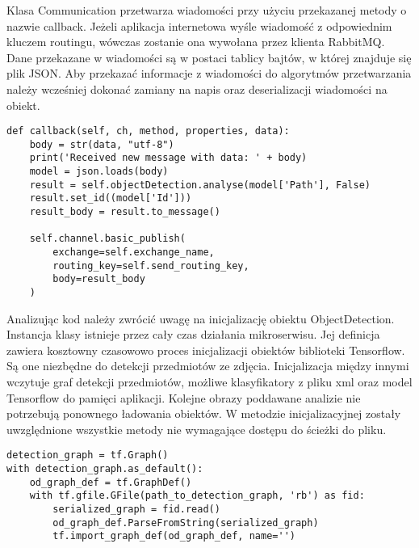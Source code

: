 \begin{itemize}
Klasa Communication przetwarza wiadomości przy użyciu przekazanej metody o nazwie callback. Jeżeli aplikacja internetowa wyśle wiadomość z odpowiednim kluczem routingu, wówczas zostanie ona wywołana przez klienta RabbitMQ. Dane przekazane w wiadomości są w postaci tablicy bajtów, w której znajduje się plik JSON. Aby przekazać informacje z wiadomości do algorytmów przetwarzania należy wcześniej dokonać zamiany na napis oraz deserializacji wiadomości na obiekt.



\begin{lstlisting}[caption={Odbieranie wiadomości w środowisku Python.}]
def callback(self, ch, method, properties, data):
	body = str(data, "utf-8")
	print('Received new message with data: ' + body)
	model = json.loads(body)
	result = self.objectDetection.analyse(model['Path'], False)
	result.set_id((model['Id']))
	result_body = result.to_message()
	
	self.channel.basic_publish(
		exchange=self.exchange_name,
		routing_key=self.send_routing_key,
		body=result_body
	)
\end{lstlisting}

Analizując kod należy zwrócić uwagę na inicjalizację obiektu ObjectDetection. Instancja klasy istnieje przez cały czas działania mikroserwisu. Jej definicja zawiera kosztowny czasowowo proces inicjalizacji obiektów biblioteki Tensorflow. Są one niezbędne do detekcji przedmiotów ze zdjęcia. Inicjalizacja między innymi wczytuje graf detekcji przedmiotów, możliwe klasyfikatory z pliku xml oraz model Tensorflow do pamięci aplikacji. Kolejne obrazy poddawane analizie nie potrzebują ponownego ładowania obiektów. W metodzie inicjalizacyjnej zostały uwzględnione wszystkie metody nie wymagające dostępu do ścieżki do pliku.
\newline
\begin{lstlisting}[caption={Fragment inicjalizacji obiektów biblioteki Tensorflow.}]
detection_graph = tf.Graph()
with detection_graph.as_default():
	od_graph_def = tf.GraphDef()
	with tf.gfile.GFile(path_to_detection_graph, 'rb') as fid:
		serialized_graph = fid.read()
		od_graph_def.ParseFromString(serialized_graph)
		tf.import_graph_def(od_graph_def, name='')
	

\end{lstlisting}
\end{itemize}
